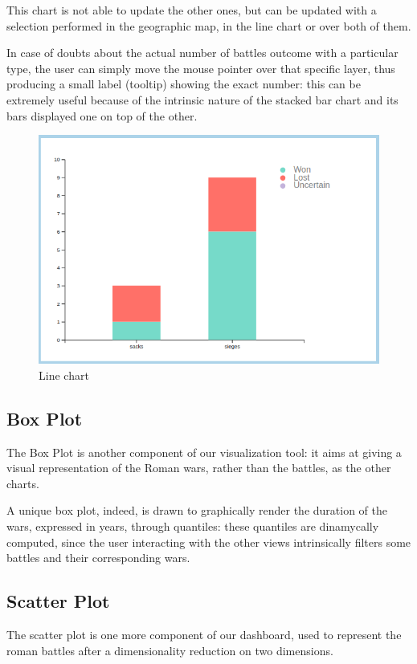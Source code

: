 This chart is not able to update the other ones, but can be updated with a selection performed in the geographic map, in the line chart or over both of them.

In case of doubts about the actual number of battles outcome with a particular type, the user can simply move the mouse pointer over that specific layer, thus producing a small label (tooltip) showing the exact number: this can be extremely useful because of the intrinsic nature of the stacked bar chart and its bars displayed one on top of the other.
\begin{figure}[h]
\centering
\includegraphics[scale=0.30]{./images/stacked_bar_chart.png}
\caption{Line chart}
\end{figure}

\subsection{Box Plot}
The Box Plot is another component of our visualization tool: it aims at giving a visual representation of the Roman wars, rather than the battles, as the other charts.

A unique box plot, indeed, is drawn to graphically render the duration of the wars, expressed in years, through quantiles: these quantiles are dinamycally computed, since the user interacting with the other views intrinsically filters some battles and their corresponding wars.

\subsection{Scatter Plot}
The scatter plot is one more component of our dashboard, used to represent the roman battles after a dimensionality reduction on two dimensions.

